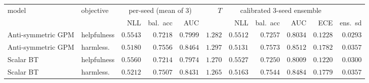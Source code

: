 \begin{tabular}{llrrrrrrrrr}
\toprule
model & objective & \multicolumn{3}{c}{per-seed (mean of 3)} & $T$ & \multicolumn{4}{c}{calibrated 3-seed ensemble} \\
\cmidrule(lr){3-5}\cmidrule(lr){7-10}
 & & NLL & bal.\ acc & AUC & & NLL & bal.\ acc & AUC & ECE & ens.\ sd\\
\midrule
Anti-symmetric GPM & helpfulness & $0.5543$ & $0.7218$ & $0.7999$ & $1.282$ & $0.5512$ & $0.7257$ & $0.8034$ & $0.1228$ & $0.0293$\\
Anti-symmetric GPM & harmless. & $0.5180$ & $0.7556$ & $0.8464$ & $1.297$ & $0.5131$ & $0.7573$ & $0.8512$ & $0.1782$ & $0.0357$\\
Scalar BT & helpfulness & $0.5560$ & $0.7214$ & $0.7974$ & $1.270$ & $0.5527$ & $0.7250$ & $0.8009$ & $0.1220$ & $0.0300$\\
Scalar BT & harmless. & $0.5212$ & $0.7507$ & $0.8431$ & $1.265$ & $0.5163$ & $0.7544$ & $0.8484$ & $0.1779$ & $0.0357$\\
\bottomrule
\end{tabular}
